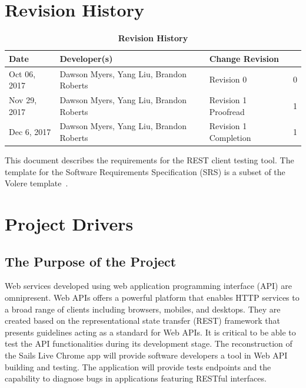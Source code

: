 \documentclass[12pt, titlepage]{article}
\newcommand{\revisionTable}{
	\begin{table}[hp]
		\caption{\bf Revision History}
		\begin{tabularx}{\textwidth}{lXlX}
		\toprule
		\textbf{Date} & \textbf{Developer(s)} & \textbf{Change}
		\textbf{Revision}\\
		\midrule
		Oct​ ​06,​ ​2017 & Dawson Myers, Yang Liu, Brandon Roberts & Revision​ ​0 & 0\\
		\hline
		Nov​ ​29,​ ​2017 & Dawson Myers, Yang Liu, Brandon Roberts & Revision​ ​1 Proofread & 1\\
		\hline
		Dec 6,​ ​2017 & Dawson Myers, Yang Liu, Brandon Roberts & Revision​ ​1 Completion & 1\\
		\hline
		\bottomrule
		\end{tabularx}
	\end{table}
}
\begin{document}






\def\thesection{\arabic{section}} 
\renewcommand\thesection{\arabic{section}} 
\renewcommand\thesubsection{\thesection.\arabic{subsection}}

\tableofcontents

\listoftables

\listoffigures


\newpage

\section{Revision History}
\revisionTable

This document describes the requirements for the REST client testing tool. The template for the Software
Requirements Specification (SRS) is a subset of the Volere template~\citep{RobertsonAndRobertson2012}.

\section{Project Drivers}



\subsection{The Purpose of the Project}
Web services developed using web application programming interface (API) are omnipresent. Web APIs offers a powerful platform that enables HTTP services to a broad range of clients including browsers, mobiles, and desktops. They are created based on the representational state transfer (REST) framework that presents guidelines acting as a standard for Web APIs. It is critical to be able to test the API functionalities during its development stage. The reconstruction of the Sails Live Chrome app will provide software developers a tool in Web API building and testing. The application will provide tests endpoints and the capability to diagnose bugs in applications featuring RESTful interfaces.
\end{document}
